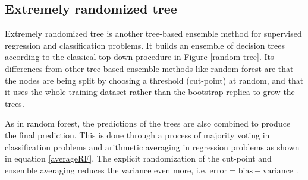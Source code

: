\subsection{Extremely randomized tree}

Extremely randomized tree is another tree-based ensemble method for supervised regression and classification problems. It builds an ensemble of decision trees according to the classical top-down procedure in Figure \ref{random tree}. Its differences from other tree-based ensemble methods like random forest are that the nodes are being split by choosing a threshold (cut-point) at random, and that it uses the whole training dataset rather than the bootstrap replica to grow the trees.  

As in random forest, the predictions of the trees are also combined to produce the final prediction. This is done through a process of majority voting in classification problems and arithmetic averaging in regression problems as shown in equation \ref{averageRF}. The explicit randomization of the cut-point and ensemble averaging reduces the variance even more, i.e. $\text{error}=\text{bias} - \text{variance}$ \citep{geurts2006extremely}. 







